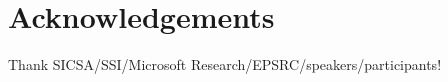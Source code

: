 \section*{Acknowledgements}
\label{s:ack}

Thank SICSA/SSI/Microsoft Research/EPSRC/speakers/participants!
